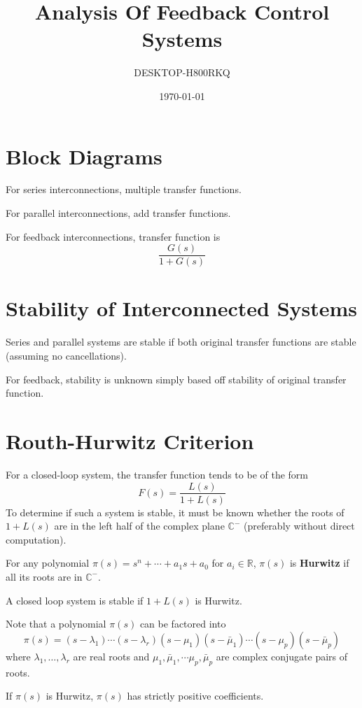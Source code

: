 \documentclass[11pt]{article}
\author{DESKTOP-H800RKQ}
\date{\today}
\title{Analysis Of Feedback Control Systems}
\begin{document}
\maketitle
\tableofcontents

\section{Block Diagrams}
\label{sec:orgdb5c011}
For series interconnections, multiple transfer functions.

For parallel interconnections, add transfer functions.

For feedback interconnections, transfer function is
$$ \frac{G(s)}{1 + G(s)} $$
\section{Stability of Interconnected Systems}
\label{sec:orgcaf9961}
Series and parallel systems are stable if both original transfer functions are stable
(assuming no cancellations).

For feedback, stability is unknown simply based off stability of original transfer
function.
\section{Routh-Hurwitz Criterion}
\label{sec:orged4d772}
For a closed-loop system, the transfer function tends to be of the form
$$ F(s) = \frac{L(s)}{1 + L(s)} $$
To determine if such a system is stable, it must be known whether
the roots of \(1+L(s)\) are in the left half of the complex plane
\(\mathbb{C}^{-}\) (preferably without direct computation).

For any polynomial \(\pi(s) = s^{n} + \cdots + a_{1}s + a_{0}\) for
\(a_{i} \in \mathbb{R}\),
\(\pi(s)\) is \textbf{Hurwitz} if all its roots are in \(\mathbb{C}^{-}\).

A closed loop system is stable if \(1 + L(s)\) is Hurwitz.

Note that a polynomial \(\pi(s)\) can be factored into
$$ \pi(s) = (s - \lambda_{1})\cdots (s - \lambda_{r}) (s - \mu_{1})(s - \bar{\mu}_{1}) \cdots (s - \mu_{p})(s - \bar{\mu}_{p}) $$
where \(\lambda_{1}, \dots, \lambda_{r}\) are real roots and \(\mu_{1}, \bar{\mu}_{1}, \cdots \mu_{p}, \bar{\mu}_{p}\) are complex conjugate pairs of roots.

If \(\pi(s)\) is Hurwitz, \(\pi(s)\) has strictly positive coefficients.
\end{document}
